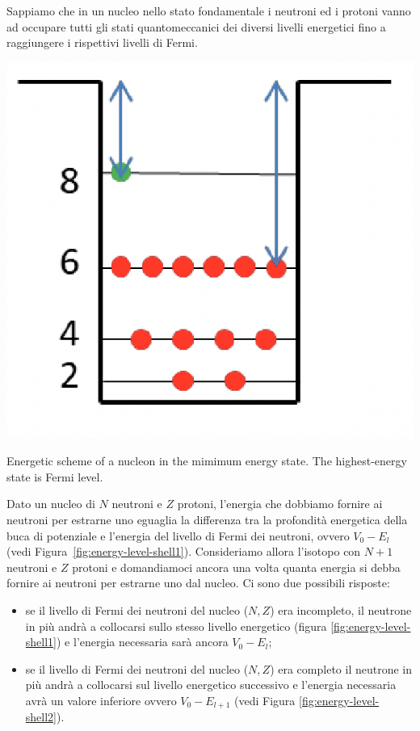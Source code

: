 Sappiamo che in un nucleo nello stato fondamentale i neutroni ed i protoni vanno ad occupare tutti gli stati quantomeccanici dei diversi livelli energetici fino a raggiungere i rispettivi livelli di Fermi.
\begin{marginfigure}
	\includegraphics{figs/energy-level-shell2}
	\caption{Energetic scheme of a nucleon in the mimimum energy state. The highest-energy state is Fermi level.}
	\label{fig:energy-level-shell2}
\end{marginfigure}
Dato un nucleo di $N$ neutroni e $Z$ protoni, l’energia che dobbiamo fornire ai neutroni per estrarne uno eguaglia la differenza tra la profondità energetica della buca di potenziale e l’energia del livello di Fermi dei neutroni, ovvero $V_{0}-E_{l}$ (vedi Figura~\ref{fig:energy-level-shell1}). Consideriamo allora l’isotopo con $N+1$ neutroni e $Z$ protoni e domandiamoci ancora una volta quanta energia si debba fornire ai neutroni per estrarne uno dal nucleo. Ci sono due possibili risposte:
\begin{itemize}
	\item se il livello di Fermi dei neutroni del nucleo ($N, Z$) era incompleto, il neutrone in più andrà a collocarsi sullo stesso livello energetico (figura \ref{fig:energy-level-shell1}) e l’energia necessaria sarà ancora $V_{0}-E_{l}$;
    \item se il livello di Fermi dei neutroni del nucleo ($N, Z$) era completo il neutrone in più andrà a collocarsi sul livello energetico successivo e l’energia necessaria avrà un valore inferiore ovvero $V_0 - E_{l+1}$ (vedi Figura \ref{fig:energy-level-shell2}).
\end{itemize}

